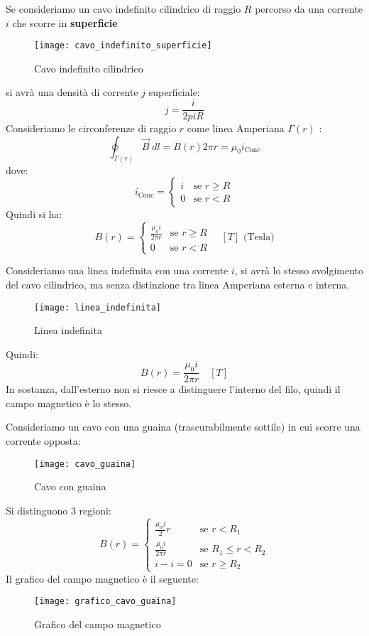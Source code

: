 \documentclass[a4paper]{article}
\begin{document}
\begin{example}
  Se consideriamo un cavo indefinito cilindrico di raggio \( R \) percorso da una corrente \( i \)
  che scorre in \textbf{superficie}
  \begin{figure}[H]
    \centering
    \texttt{[image: cavo\_indefinito\_superficie]}
    \caption{Cavo indefinito cilindrico}
  \end{figure}
  \noindent
  si avrà una densità di corrente \( j \) superficiale:
  \[
    j = \frac{i}{2 pi R}
  \] 
  Consideriamo le circonferenze di raggio \( r \) come linea Amperiana \( \Gamma(r) \) :
  \[
    \oint_{\Gamma(r)} \vec{B} \; dl = B(r) 2 \pi r = \mu_0 i_{\text{Conc}}
  \] 
  dove:
  \[
    i_{\text{Conc}} = \begin{cases}
      i & \text{se } r \ge R \\
      0 & \text{se } r < R
    \end{cases}
  \]
  Quindi si ha:
  \[
    B(r) = \begin{cases}
      \frac{\mu_0 i}{2 \pi r} & \text{se } r \ge R \\
      0 & \text{se } r < R
    \end{cases}
    \quad \left[ T \right] \text{ (Tesla)}
  \]
\end{example}

\begin{example}
  Consideriamo una linea indefinita con una corrente \( i \), si avrà lo stesso svolgimento
  del cavo cilindrico, ma senza distinzione tra linea Amperiana esterna e interna.
  \begin{figure}[H]
    \centering
    \texttt{[image: linea\_indefinita]}
    \caption{Linea indefinita}
  \end{figure}
  \noindent
  Quindi:
  \[
    B(r) = \frac{\mu_0 i}{2 \pi r} \quad \left[ T \right]
  \] 
  In sostanza, dall'esterno non si riesce a distinguere l'interno del filo,
  quindi il campo magnetico è lo stesso.
\end{example}

\begin{example}
  Consideriamo un cavo con una guaina (trascurabilmente sottile) in cui scorre una
  corrente opposta:
  \begin{figure}[H]
    \centering
    \texttt{[image: cavo\_guaina]}
    \caption{Cavo con guaina}
  \end{figure}
  \noindent
  Si distinguono 3 regioni:
  \[
    B(r) = \begin{cases}
      \frac{\mu_0 j}{2}r & \text{se } r < R_1 \\
      \frac{\mu_0 i}{2 \pi r} & \text{se } R_1 \le r < R_2 \\
      i - i = 0 & \text{se } r \ge R_2
    \end{cases}
  \] 
  Il grafico del campo magnetico è il seguente:
  \begin{figure}[H]
    \centering
    \texttt{[image: grafico\_cavo\_guaina]}
    \caption{Grafico del campo magnetico}
  \end{figure}
\end{example}
\end{document}
